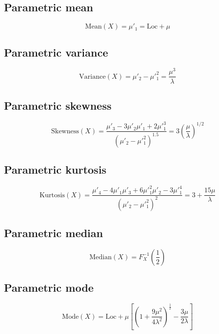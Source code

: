 \documentclass{article}
\begin{document}
\subsection{Parametric mean}
\begin{equation*} \mathrm{Mean}(X)=\mu'_{1}=\text{Loc}+\mu \end{equation*}
\subsection{Parametric variance}
\begin{equation*} \mathrm{Variance}(X)=\mu'_{2}-\mu'^{2}_{1}=\frac{\mu^3}{\lambda} \end{equation*}
\subsection{Parametric skewness}
\begin{equation*} \mathrm{Skewness}(X)=\frac{\mu'_{3}-3\mu'_{2}\mu'_{1}+2\mu'^{3}_{1}}{(\mu'_{2}-\mu'^{2}_{1})^{1.5}}=3\left(\frac{\mu}{\lambda}\right)^{1/2} \end{equation*}
\subsection{Parametric kurtosis}
\begin{equation*} \mathrm{Kurtosis}(X)=\frac{\mu'_{4}-4\mu'_{1}\mu'_{3}+6\mu'^{2}_{1}\mu'_{2}-3\mu'^{4}_{1}}{(\mu'_{2}-\mu'^{2}_{1})^{2}}=3+\frac{15 \mu}{\lambda} \end{equation*}
\subsection{Parametric median}
\begin{equation*} \mathrm{Median}(X)=F^{-1}_{X}\left(\frac{1}{2}\right) \end{equation*}
\subsection{Parametric mode}
\begin{equation*} \mathrm{Mode}(X)=\text{Loc}+\mu\left[\left(1+\frac{9 \mu^2}{4 \lambda^2}\right)^\frac{1}{2}-\frac{3 \mu}{2 \lambda}\right] \end{equation*}
\end{document}
